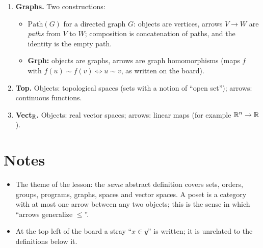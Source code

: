 \documentclass[11pt]{article}
\begin{document}
\begin{enumerate}
  \item \textbf{Graphs.} Two constructions:
  \begin{itemize}[nosep]
    \item $\mathrm{Path}(G)$ for a directed graph $G$: objects are vertices, arrows $V\to W$ are \emph{paths} from $V$ to $W$; composition is concatenation of paths, and the identity is the empty path.
    \item \textbf{Grph:} objects are graphs, arrows are graph homomorphisms (maps $f$ with $f(u)\sim f(v)\iff u\sim v$, as written on the board).
  \end{itemize}

  \item \textbf{Top.} Objects: topological spaces (sets with a notion of ``open set''); arrows: continuous functions.

  \item \textbf{Vect$_{\mathbb{R}}$.} Objects: real vector spaces; arrows: linear maps (for example $\mathbb{R}^n\to\mathbb{R}$).
\end{enumerate}

\section*{Notes}
\begin{itemize}[nosep]
  \item The theme of the lesson: the \emph{same} abstract definition covers sets, orders, groups, programs, graphs, spaces and vector spaces. A poset is a category with at most one arrow between any two objects; this is the sense in which ``arrows generalize $\le$''.
  \item At the top left of the board a stray ``$x\in y$'' is written; it is unrelated to the definitions below it.
\end{itemize}
\end{document}
